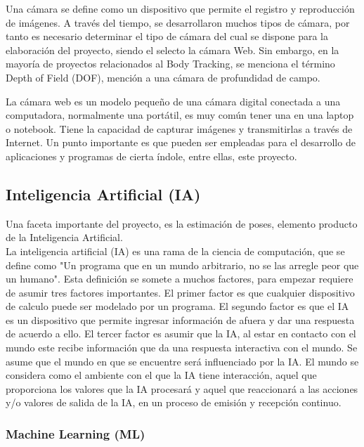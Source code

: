 Una cámara se define como un dispositivo que permite el registro y reproducción de imágenes. A través del tiempo, se desarrollaron muchos tipos de cámara, por tanto es necesario determinar el tipo de cámara del cual se dispone para la elaboración del proyecto, siendo el selecto la cámara Web. Sin embargo, en la mayoría de proyectos relacionados al Body Tracking, se menciona el término Depth of Field (DOF), mención a una cámara de profundidad de campo.

La cámara web es un modelo pequeño de una cámara digital conectada a una computadora, normalmente una portátil, es muy común tener una en una laptop o notebook. Tiene la capacidad de capturar imágenes y transmitirlas a través de Internet. Un punto importante es que pueden ser empleadas para el desarrollo de aplicaciones y programas de cierta índole, entre ellas, este proyecto. 

\subsection{Inteligencia Artificial (IA)}

Una faceta importante del proyecto, es la estimación de poses, elemento producto de la Inteligencia Artificial.
\\
La inteligencia artificial (IA) es una rama de la ciencia de computación, que se define como "Un programa que en un mundo arbitrario, no se las arregle peor que un humano"\cite{dobrev2012definition}. 
Esta definición se somete a muchos factores, para empezar requiere de asumir tres factores importantes.
El primer factor es que cualquier dispositivo de calculo puede ser modelado por un programa. El segundo factor es que el IA es un dispositivo que permite ingresar información de afuera y dar una respuesta de acuerdo a ello. El tercer factor es asumir que la IA, al estar en contacto con el mundo este recibe información que da una respuesta interactiva con el mundo. Se asume que el mundo en que se encuentre será influenciado por la IA\cite{dobrev2012definition}. El mundo se considera como el ambiente con el que la IA tiene interacción, aquel que proporciona los valores que la IA procesará y aquel que reaccionará a las acciones y/o valores de salida de la IA, en un proceso de emisión y recepción continuo.

\subsubsection{Machine Learning (ML)}

